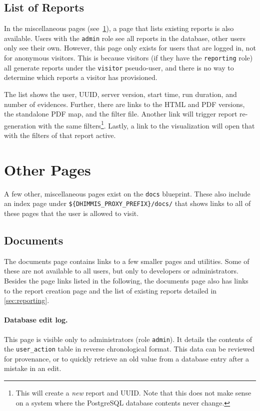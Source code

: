\subsection{List of Reports}
\label{sec:report-list}

In the miscellaneous pages (see~\cref{sec:other-pages}), a page that lists existing reports is also available.
Users with the \verb!admin! role see all reports in the database, other users only see their own.
However, this page only exists for users that are logged in, not for anonymous visitors.
This is because visitors (if they have the \verb!reporting! role) all generate reports under the \verb!visitor! pseudo-user, and there is no way to determine which reports a visitor has provisioned.

The list shows the user, UUID, server version, start time, run duration, and number of evidences.
Further, there are links to the HTML and PDF versions, the standalone PDF map, and the filter file.
Another link will trigger report re-generation with the same filters\footnote{%
  This will create a \emph{new} report and UUID.
  Note that this does not make sense on a system where the PostgreSQL database contents never change.
  }.
Lastly, a link to the visualization will open that with the filters of that report active.


\section{Other Pages}
\label{sec:other-pages}

A few other, miscellaneous pages exist on the \verb!docs! blueprint.
These also include an index page under \verb!${DHIMMIS_PROXY_PREFIX}/docs/! that shows links to all of these pages that the user is allowed to visit.

\subsection{Documents}

The documents page contains links to a few smaller pages and utilities.
Some of these are not available to all users, but only to developers or administrators.
Besides the page links listed in the following, the documents page also has links to the report creation page and the list of existing reports detailed in \cref{sec:reporting}.

\paragraph*{Database edit log.}
This page is visible only to administrators (role \verb!admin!).
It details the contents of the \verb!user_action! table in reverse chronological format.
This data can be reviewed for provenance, or to quickly retrieve an old value from a database entry after a mistake in an edit.

